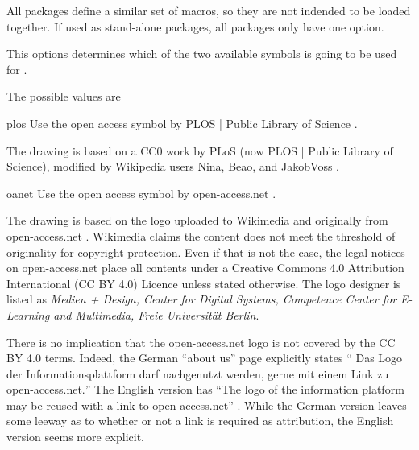 \documentclass[DIV=9]{scrartcl}
\begin{document}
All packages define a similar set of macros, so they are not indended to
be loaded together.
If used as stand-alone packages, all packages only have one option.

\begin{optionlist}

This options determines which of the two available symbols is going to
be used for .

The possible values are
\begin{valuelist}
\item[plos] Use the open access symbol by PLOS | Public Library of Science%
   .

  The drawing is based on a CC0%
  work by PLoS (now PLOS | Public Library of Science),
  modified by Wikipedia users Nina, Beao, and JakobVoss%
.

\item[oanet] Use the open access symbol by open-access.net%
  .

  The drawing is based on the logo uploaded to Wikimedia%
  and originally from open-access.net%
  .
  Wikimedia claims the content does not meet the threshold of originality
  for copyright protection.
  Even if that is not the case, the legal notices on open-access.net%
  place all contents under a Creative Commons 4.0 Attribution International
  (CC BY 4.0) Licence
  unless stated otherwise.
  The logo designer is listed as
  \emph{Medien + Design,
  Center for Digital Systems,
  Competence Center for E-Learning and Multimedia, Freie Universität Berlin}.

  There is no implication that the open-access.net logo is not covered by
  the CC BY 4.0 terms.
  Indeed, the German \enquote{about us} page explicitly states
  \foreignquote{ngerman}{%
    Das Logo der Informationsplattform darf nachgenutzt werden,
    gerne mit einem Link zu open-access.net.}%
  The English version has \enquote{The logo of the information platform
  may be reused with a link to open-access.net}%
  .
  While the German version leaves some leeway as to whether or not a link is
  required as attribution, the English version seems more explicit.


\end{valuelist}
\end{optionlist}
\end{document}
